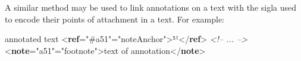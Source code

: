 A similar method may be used to link annotations on a text with the sigla used to encode their points of attachment in a text. For example: \par\bgroup{}\exampleFont \begin{shaded}\noindent\mbox{}annotated text {<\textbf{ref}\hspace*{1em}{target}="{\#a51}"\hspace*{1em}{type}="{noteAnchor}">}⁵¹{</\textbf{ref}>}\mbox{}\newline 
\textit{<!-- ... -->}\mbox{}\newline 
{<\textbf{note}\hspace*{1em}{xml:id}="{a51}"\hspace*{1em}{type}="{footnote}">}text of annotation{</\textbf{note}>}\end{shaded}\egroup\par \par
